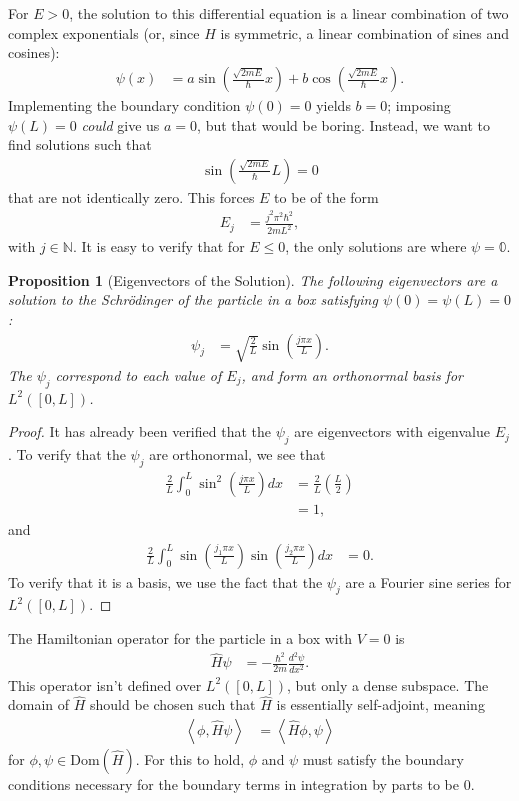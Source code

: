 \documentclass[12pt]{extarticle}
\newcommand{\N}{\mathbb{N}}
\newcommand{\iprod}[2]{\left\langle #1,#2\right\rangle}
\theoremstyle{plain}
\newtheorem*{proposition}{Proposition}%
\theoremstyle{definition}
\theoremstyle{remark}
\begin{document}
  For $E > 0$, the solution to this differential equation is a linear combination of two complex exponentials (or, since $\hat{H}$ is symmetric, a linear combination of sines and cosines):
  \begin{align*}
    \psi(x) &= a\sin\left(\frac{\sqrt{2mE}}{\hbar}x\right) + b\cos\left(\frac{\sqrt{2mE}}{\hbar}x\right).
  \end{align*}
  Implementing the boundary condition $\psi(0) = 0$ yields $b = 0$; imposing $\psi(L) = 0$ \textit{could} give us $a = 0$, but that would be boring. Instead, we want to find solutions such that
  \begin{align*}
    \sin \left(\frac{\sqrt{2mE}}{\hbar}L\right) = 0
  \end{align*}
  that are not identically zero. This forces $E$ to be of the form
  \begin{align*}
    E_j &= \frac{j^2\pi^2\hbar^2}{2mL^2},
  \end{align*}
  with $j \in \N$. It is easy to verify that for $E \leq 0$, the only solutions are where $\psi = \mathbb{0}$.
  \begin{proposition}[Eigenvectors of the Solution]
    The following eigenvectors are a solution to the Schrödinger of the particle in a box satisfying $\psi(0) = \psi(L) = 0$:
    \begin{align*}
      \psi_j &= \sqrt{\frac{2}{L}}\sin\left(\frac{j\pi x}{L}\right).
    \end{align*}
    The $\psi_j$ correspond to each value of $E_j$, and form an orthonormal basis for $L^{2}([0,L])$.
  \end{proposition}
  \begin{proof}
    It has already been verified that the $\psi_j$ are eigenvectors with eigenvalue $E_j$. To verify that the $\psi_j$ are orthonormal, we see that
    \begin{align*}
      \frac{2}{L}\int_{0}^{L}\sin^2\left(\frac{j\pi x}{L}\right)dx &= \frac{2}{L}\left(\frac{L}{2}\right)\\
                                                                   &= 1,
    \end{align*}
    and
    \begin{align*}
      \frac{2}{L}\int_{0}^{L}\sin\left(\frac{j_1\pi x}{L}\right) \sin\left(\frac{j_2\pi x}{L}\right) dx &= 0.
    \end{align*}
    To verify that it is a basis, we use the fact that the $\psi_j$ are a Fourier sine series for $L^{2}([0,L])$.
  \end{proof}
  The Hamiltonian operator for the particle in a box with $V = 0$ is
  \begin{align*}
    \hat{H}\psi &= -\frac{\hbar^2}{2m}\frac{d^2\psi}{dx^2}.
  \end{align*}
  This operator isn't defined over $L^{2}([0,L])$, but only a dense subspace. The domain of $\hat{H}$ should be chosen such that $\hat{H}$ is essentially self-adjoint, meaning
  \begin{align*}
    \iprod{\phi}{\hat{H}\psi} &= \iprod{\hat{H}\phi}{\psi}
  \end{align*}
  for $\phi,\psi \in \text{Dom}(\hat{H})$. For this to hold, $\phi$ and $\psi$ must satisfy the boundary conditions necessary for the boundary terms in integration by parts to be $0$.
\end{document}

